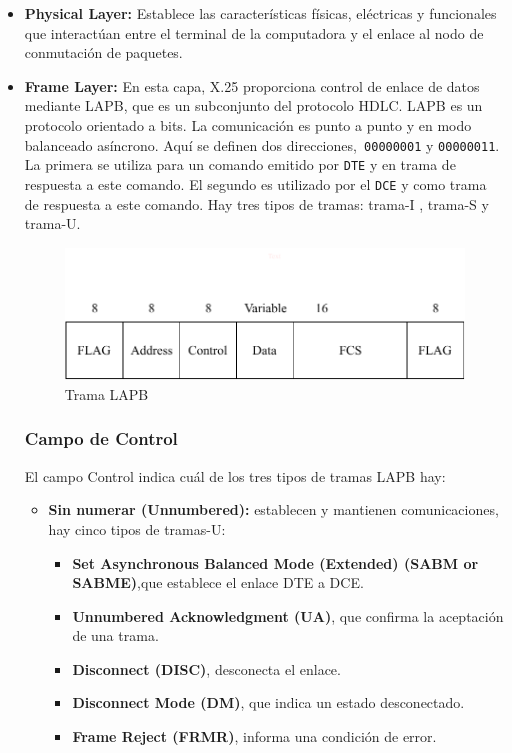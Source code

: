\begin{itemize}
\item \textbf{Physical Layer:} Establece las características físicas, eléctricas y funcionales que interactúan entre el terminal de la computadora y el enlace al nodo de conmutación de paquetes.
\item \textbf{Frame Layer:} En esta capa, X.25 proporciona control de enlace de datos mediante LAPB, que es un subconjunto del protocolo HDLC. LAPB es un protocolo orientado a bits. La comunicación es punto a punto y en modo balanceado asíncrono. Aquí se definen dos direcciones,\texttt{ 00000001} y \texttt{00000011}. La primera se utiliza para un comando emitido por \texttt{DTE} y en trama de respuesta a este comando. El segundo es utilizado por el \texttt{DCE} y como trama de respuesta a este comando. Hay tres tipos de tramas: trama-I , trama-S y trama-U.

\begin{figure}[ht!]
\centering
\includegraphics[scale=0.75]{Imagenes/x25lapb.pdf}
\caption{Trama LAPB}
\end{figure}

\subsubsection*{Campo de Control}
El campo Control indica cuál de los tres tipos de tramas LAPB hay:
\begin{itemize}
\item \textbf{Sin numerar (Unnumbered):} establecen y mantienen comunicaciones, hay cinco tipos de tramas-U:
\begin{itemize}
\item \textbf{Set Asynchronous Balanced Mode (Extended) (SABM or SABME)},que establece el enlace DTE a DCE.
\item \textbf{Unnumbered Acknowledgment (UA)}, que confirma la aceptación de una trama.
\item \textbf{Disconnect (DISC)}, desconecta el enlace.
\item \textbf{Disconnect Mode (DM)}, que indica un estado desconectado.
\item \textbf{Frame Reject (FRMR)}, informa una condición de error.
\end{itemize}


\end{itemize}
\end{itemize}
